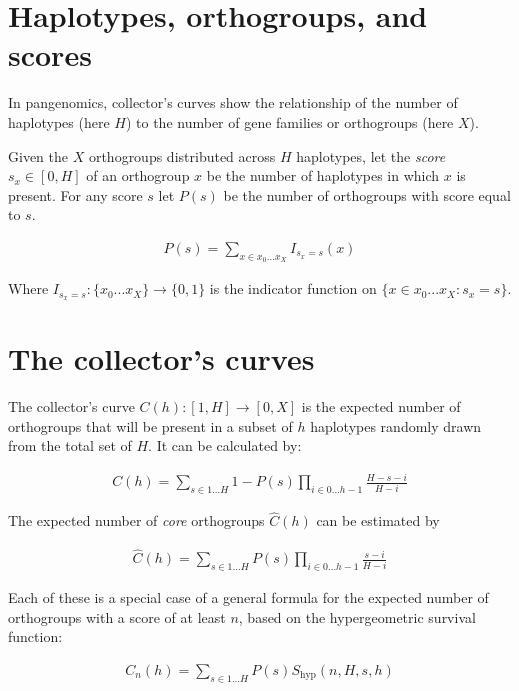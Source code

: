 \documentclass[12pt]{scrartcl}
\begin{document}
\maketitle

\section*{Haplotypes, orthogroups, and scores}

In pangenomics, collector's curves show the relationship of the number of haplotypes (here $H$) to the number of gene families or orthogroups (here $X$).

Given the $X$ orthogroups distributed across $H$ haplotypes, let the \emph{score} $s_x \in [0,H]$ of an orthogroup $x$ be the number of haplotypes in which $x$ is present. For any score $s$ let $P(s)$ be the number of orthogroups with score equal to $s$. 

\begin{align}
    P(s) = \sum_{x \in x_0 ... x_X} I_{s_x=s}(x)
\end{align}

Where $I_{s_x=s} : \{x_0 ... x_X\} \rightarrow \{0,1\}$ is the indicator function on $\{x \in x_0 ... x_X : s_x=s\}$. 

\section*{The collector's curves}

The collector's curve $C(h):[1,H] \rightarrow [0,X]$ is the expected number of orthogroups that will be present in a subset of $h$ haplotypes randomly drawn from the total set of $H$. It can be calculated by:

\begin{align}
    C(h) = \sum_{s \in 1...H} 1 - P(s)\prod_{i \in 0...h-1}\frac{H-s-i}{H-i}
\end{align}

The expected number of \emph{core} orthogroups $\hat{C}(h)$ can be estimated by

\begin{align}
    \hat{C}(h) = \sum_{s \in 1...H} P(s)\prod_{i \in 0...h-1}\frac{s-i}{H-i}
\end{align}

Each of these  is a special case of a general formula for the expected number of orthogroups with a score of at least $n$, based on the hypergeometric survival function:

\begin{align}
    C_n(h) = \sum_{s \in 1...H}P(s)S_\text{hyp}(n, H, s, h)
\end{align}
\end{document}
